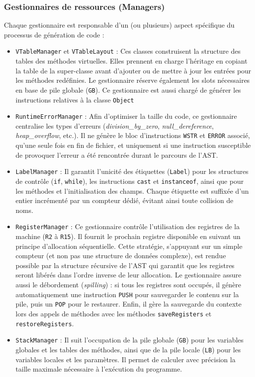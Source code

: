 \subsubsection{Gestionnaires de ressources (Managers)}
\noindent Chaque gestionnaire est responsable d'un (ou plusieurs) aspect spécifique du processus de génération de code :

\begin{itemize}[label=$\to$]
    \item \texttt{VTableManager} et \texttt{VTableLayout} : Ces classes construisent la structure des tables des méthodes virtuelles. Elles prennent en charge l'héritage en copiant la table de la super-classe avant d'ajouter ou de mettre à jour les entrées pour les méthodes redéfinies. Le gestionnaire réserve également les slots nécessaires en base de pile globale (\texttt{GB}). Ce gestionnaire est aussi chargé de générer les instructions relatives à la classe \texttt{Object}
    \item \texttt{RuntimeErrorManager} : Afin d'optimiser la taille du code, ce gestionnaire centralise les types d'erreurs (\textit{division\_by\_zero}, \textit{null\_dereference}, \textit{heap\_overflow}, etc.). Il ne génère le bloc d'instructions \texttt{WSTR} et \texttt{ERROR} associé, qu'une seule fois en fin de fichier, et uniquement si une instruction susceptible de provoquer l'erreur a été rencontrée durant le parcours de l'AST.
    \item \texttt{LabelManager} : Il garantit l'unicité des étiquettes (\texttt{Label}) pour les structures de contrôle (\texttt{if}, \texttt{while}), les instructions \texttt{cast} et \texttt{instanceof}, ainsi que pour les méthodes et l'initialisation des champs. Chaque étiquette est suffixée d'un entier incrémenté par un compteur dédié, évitant ainsi toute collision de noms.
    \item \texttt{RegisterManager} : Ce gestionnaire contrôle l'utilisation des registres de la machine (\texttt{R2} à \texttt{R15}). Il fournit le prochain registre disponible en suivant un principe d'allocation séquentielle. Cette stratégie, s'appuyant sur un simple compteur (et non pas une structure de données complexe), est rendue possible par la structure récursive de l'AST qui garantit que les registres seront libérés dans l'ordre inverse de leur allocation. Le gestionnaire assure aussi le débordement (\textit{spilling}) : si tous les registres sont occupés, il génère automatiquement une instruction \texttt{PUSH} pour sauvegarder le contenu sur la pile, puis un \texttt{POP} pour le restaurer. Enfin, il gère la sauvegarde du contexte lors des appels de méthodes avec les méthodes \texttt{saveRegisters} et \texttt{restoreRegisters}.
    \item \texttt{StackManager} : Il suit l'occupation de la pile globale (\texttt{GB}) pour les variables globales et les tables des méthodes, ainsi que de la pile locale (\texttt{LB}) pour les variables locales et les paramètres. Il permet de calculer avec précision la taille maximale nécessaire à l'exécution du programme.
\end{itemize}


